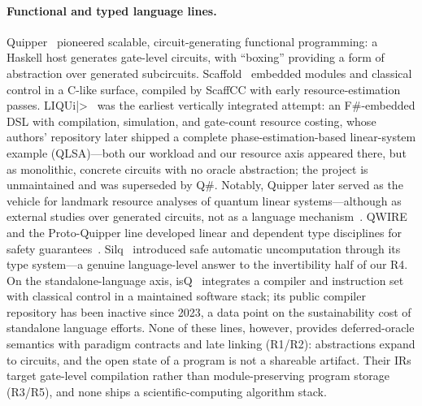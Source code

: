 \paragraph{Functional and typed language lines.}
Quipper~\cite{green2013quipper} pioneered scalable, circuit-generating
functional programming: a Haskell host generates gate-level circuits, with
``boxing'' providing a form of abstraction over generated subcircuits.
Scaffold~\cite{javadiabhari2015scaffcc} embedded modules and classical
control in a C-like surface, compiled by ScaffCC with early
resource-estimation passes.  LIQUi|>~\cite{wecker2014liquid} was the
earliest vertically integrated attempt: an F\#-embedded DSL with
compilation, simulation, and gate-count resource costing, whose authors'
repository later shipped a complete phase-estimation-based linear-system
example (QLSA)---both our workload and our resource axis appeared there,
but as monolithic, concrete circuits with no oracle abstraction; the
project is unmaintained and was superseded by Q\#.  Notably, Quipper later served as the vehicle
for landmark resource analyses of quantum linear systems---although as
external studies over generated circuits, not as a language
mechanism~\cite{scherer2017resource,fillion2017dirac}.  QWIRE and the Proto-Quipper line developed linear and dependent type
disciplines for safety guarantees~\cite{paykin2017qwire,fu2023protoquipper}.
Silq~\cite{bichsel2020silq} introduced safe automatic uncomputation through
its type system---a genuine language-level answer to the invertibility half
of our R4.  On the standalone-language axis, isQ~\cite{guo2023isq}
integrates a compiler and instruction set with classical control in a
maintained software stack; its public compiler repository has been
inactive since 2023, a data point on the sustainability cost of
standalone language efforts.  None of these lines, however, provides deferred-oracle
semantics with paradigm contracts and late linking (R1/R2): abstractions
expand to circuits, and the open state of a program is not a shareable
artifact.  Their IRs target gate-level compilation rather than
module-preserving program storage (R3/R5), and none ships a
scientific-computing algorithm stack.

